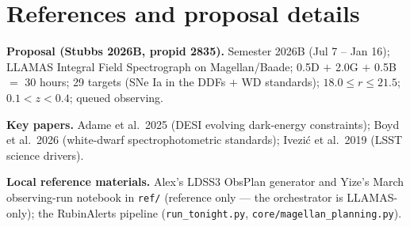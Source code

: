 \documentclass[11pt,letterpaper]{article}
\begin{document}
\section{References and proposal details}
\textbf{Proposal (Stubbs 2026B, propid 2835).} Semester 2026B (Jul 7 -- Jan 16); LLAMAS
Integral Field Spectrograph on Magellan/Baade; 0.5D $+$ 2.0G $+$ 0.5B $=$ 30 hours; 29
targets (SNe Ia in the DDFs $+$ WD standards); $18.0 \le r \le 21.5$; $0.1 < z < 0.4$;
queued observing.

\textbf{Key papers.} Adame et al.\ 2025 (DESI evolving dark-energy constraints);
Boyd et al.\ 2026 (white-dwarf spectrophotometric standards); Ivezi\'c et al.\ 2019 (LSST
science drivers).

\textbf{Local reference materials.} Alex's LDSS3 ObsPlan generator and Yize's March
observing-run notebook in \texttt{ref/} (reference only --- the orchestrator is LLAMAS-only);
the RubinAlerts pipeline (\texttt{run\_tonight.py}, \texttt{core/magellan\_planning.py}).
\end{document}
